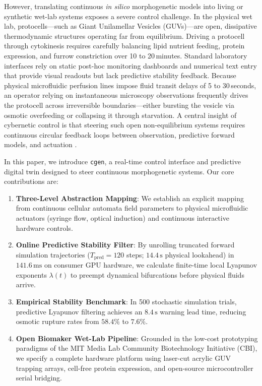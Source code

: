\documentclass[letterpaper]{article}
\begin{document}
However, translating continuous \textit{in silico} morphogenetic models into living or synthetic wet-lab systems exposes a severe control challenge. In the physical wet lab, protocells—such as Giant Unilamellar Vesicles (GUVs)—are open, dissipative thermodynamic structures operating far from equilibrium. Driving a protocell through cytokinesis requires carefully balancing lipid nutrient feeding, protein expression, and furrow constriction over 10 to 20\,minutes. Standard laboratory interfaces rely on static post-hoc monitoring dashboards and numerical text entry that provide visual readouts but lack predictive stability feedback. Because physical microfluidic perfusion lines impose fluid transit delays of 5 to 30\,seconds, an operator relying on instantaneous microscopy observations frequently drives the protocell across irreversible boundaries—either bursting the vesicle via osmotic overfeeding or collapsing it through starvation. A central insight of cybernetic control is that steering such open non-equilibrium systems requires continuous circular feedback loops between observation, predictive forward models, and actuation \citep{wiener1948cybernetics,ashby1956introduction}.

In this paper, we introduce \texttt{cgen}, a real-time control interface and predictive digital twin designed to steer continuous morphogenetic systems. Our core contributions are:
\begin{enumerate}
    \item \textbf{Three-Level Abstraction Mapping}: We establish an explicit mapping from continuous cellular automata field parameters to physical microfluidic actuators (syringe flow, optical induction) and continuous interactive hardware controls.
    \item \textbf{Online Predictive Stability Filter}: By unrolling truncated forward simulation trajectories ($T_{\text{pred}} = 120$ steps; $14.4\,\text{s}$ physical lookahead) in $141.6\,\text{ms}$ on consumer GPU hardware, we calculate finite-time local Lyapunov exponents $\lambda(t)$ to preempt dynamical bifurcations before physical fluids arrive.
    \item \textbf{Empirical Stability Benchmark}: In 500 stochastic simulation trials, predictive Lyapunov filtering achieves an $8.4\,\text{s}$ warning lead time, reducing osmotic rupture rates from $58.4\%$ to $7.6\%$.
    \item \textbf{Open Biomaker Wet-Lab Pipeline}: Grounded in the low-cost prototyping paradigms of the MIT Media Lab Community Biotechnology Initiative (CBI), we specify a complete hardware platform using laser-cut acrylic GUV trapping arrays, cell-free protein expression, and open-source microcontroller serial bridging.
\end{enumerate}
\end{document}

